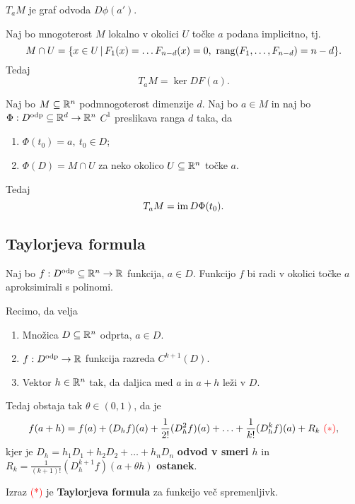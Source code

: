 \begin{opomba}
    \(T_aM\) je graf odvoda \(D \phi(a')\).
\end{opomba}

\begin{trditev}
    Naj bo mnogoterost \(M\) lokalno v okolici \(U\) točke \(a\) podana implicitno, tj.\
    \[
        M \cap U = \{x \in U \,|\, F_1(x) = \ldots F_{n-d}(x)=0,\ \operatorname{rang}(F_1, \ldots, F_{n-d}) = n-d\}.
    \]
    Tedaj 
    \[
        T_aM = \ker DF(a).
    \]
\end{trditev}

\begin{trditev}
    Naj bo \(M \subseteq \mathbb{R}^n\) podmnogoterost dimenzije \(d\). Naj bo \(a \in M\) in naj bo \(\Phi: D^\text{odp} \subseteq \mathbb{R}^d \to \mathbb{R}^n\) \(C^1\) preslikava ranga \(d\) taka, da 
    \begin{enumerate}
        \item \(\Phi(t_0) = a, \ t_0 \in D\);
        \item \(\Phi(D) = M \cap U\) za neko okolico \(U \subseteq \mathbb{R}^n\) točke \(a\).
    \end{enumerate}
    Tedaj 
    \[
        T_aM = \operatorname{im} D\Phi (t_0).
    \] 
\end{trditev}

\newpage
\subsection{Taylorjeva formula}
Naj bo $f: D^{\text{odp}} \subseteq \mathbb{R}^n \to \mathbb{R}$ funkcija, $a \in D$. Funkcijo $f$ bi radi v okolici točke $a$ aproksimirali s polinomi.

\begin{izrek}
    Recimo, da velja
    \begin{enumerate}
        \item Množica $D \subseteq \mathbb{R}^n$ odprta, $a \in D$.
        \item $f: D^{\text{odp}} \to \mathbb{R}$ funkcija razreda $C^{k+1}(D)$.
        \item Vektor $h \in \mathbb{R}^n$ tak, da daljica med $a$ in $a+h$ leži v $D$.
    \end{enumerate}
    Tedaj obstaja tak $\theta \in (0,1)$, da je 
    $$f(a+h) = f(a) + (D_hf)(a) + \frac{1}{2!}(D_h^2f)(a) + \ldots + \frac{1}{k!} (D_h^kf)(a) + R_k \ \textcolor{red}{(*)},$$
    kjer je $D_h = h_1D_1 + h_2D_2 + \ldots + h_nD_n$ \textbf{odvod v smeri $h$} in $R_k = \frac{1}{(k+1)!} (D_h^{k+1}f)(a + \theta h)$ \textbf{ostanek}.

    Izraz \textcolor{red}{(*)} je \textbf{Taylorjeva formula} za funkcijo več spremenljivk.
\end{izrek}

